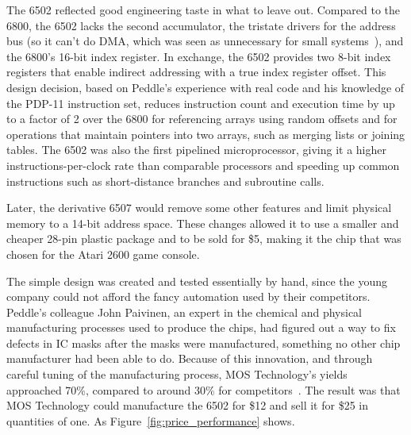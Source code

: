 \begin{tangent}
    The 6502 reflected good engineering taste in what to leave out.
    Compared to the 6800, the 6502 lacks the second accumulator, the
    tristate drivers for the address bus (so it can't do DMA, which was seen as
    unnecessary for small systems~\cite{byte75:6502}), 
    and the 6800's 16-bit index register.  In exchange, the 6502 provides two
     8-bit index registers that enable
    indirect addressing with a true index register offset.
    This design decision, based on Peddle's experience with real
    code and his knowledge of the PDP-11 instruction set, 
    reduces instruction count and execution time by up to a
    factor of 2 over the 6800 for referencing arrays using random
    offsets and for operations that
    maintain pointers into two arrays, such as merging lists or joining tables.
    The 6502 was also the first pipelined
    microprocessor, giving it a higher instructions-per-clock 
    rate than comparable processors and speeding up
    common instructions such as short-distance branches
     and subroutine calls.

    Later, the derivative 6507 would
    remove some other features and limit
    physical memory to a 14-bit address space.  These changes allowed it to
    use a smaller and cheaper 28-pin 
    plastic package and to be sold for \$5,
    making it the chip that was chosen for the Atari 2600 game console.
\end{tangent}

The simple design was created and tested essentially by hand,
since the young company could not afford the
fancy automation used by their competitors.
Peddle's colleague John Paivinen, an expert in the chemical
and physical manufacturing processes used to produce the chips, had
figured out a way to fix defects in IC masks after the masks were
manufactured, something no other chip manufacturer had been able to do.
Because of this innovation, and through careful tuning of the manufacturing process,
MOS Technology's yields approached 70\%,
compared to around 30\% for competitors~\cite{commodore}.
The result was that MOS Technology could manufacture the 6502 for \$12
and sell it for \$25 in  quantities of one.  As
Figure~\ref{fig:price_performance} shows.

